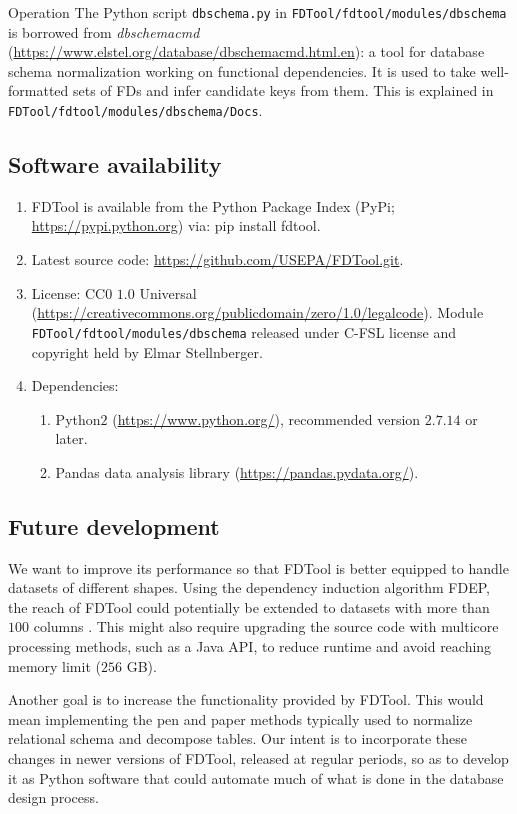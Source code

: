 \documentclass[6pt,twoside]{article}
\theoremstyle{plain}
\theoremstyle{definition}
\begin{document}
\begin{section}{Operation}
The Python script \texttt{dbschema.py} in \texttt{FDTool/fdtool/modules/dbschema} is borrowed from \textit{dbschemacmd} (\url{https://www.elstel.org/database/dbschemacmd.html.en}): a tool for database schema normalization working on functional dependencies. It is used to take well-formatted sets of FDs and infer candidate keys from them. This is explained in \texttt{FDTool/fdtool/modules/dbschema/Docs}.

\subsection[Software availability]{Software availability}

\begin{enumerate}
	\item FDTool is available from the Python Package Index (PyPi; \url{https://pypi.python.org}) via: pip install fdtool.
	\item Latest source code: \url{https://github.com/USEPA/FDTool.git}.
	\item License: CC0 $1.0$ Universal (\url{https://creativecommons.org/publicdomain/zero/1.0/legalcode}). Module \texttt{FDTool/fdtool/modules/dbschema} released under C-FSL license and copyright held by Elmar Stellnberger.
	\item Dependencies: 
	\begin{enumerate}
		\item Python$2$ (\url{https://www.python.org/}), recommended version $2.7.14$ or later.
		\item Pandas data analysis library (\url{https://pandas.pydata.org/}).
	\end{enumerate}
\end{enumerate}

\subsection[Future development]{Future development}

We want to improve its performance so that FDTool is better equipped to handle datasets of different shapes. Using the dependency induction algorithm FDEP, the reach of FDTool could potentially be extended to datasets with more than $100$ columns \cite{expAlgs}. This might also require upgrading the source code with multicore processing methods, such as a Java API, to reduce runtime and avoid reaching memory limit ($256$ GB).

Another goal is to increase the functionality provided by FDTool. This would mean implementing the pen and paper methods typically used to normalize relational schema and decompose tables. Our intent is to incorporate these changes in newer versions of FDTool, released at regular periods, so as to develop it as Python software that could automate much of what is done in the database design process.

\end{section}




\end{document}
